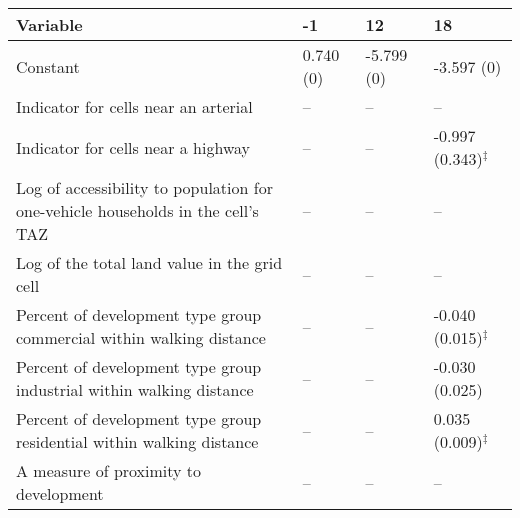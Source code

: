 
\begin{tabular}{p{3in}p{0.5in}p{0.5in}p{0.5in}}
\hline\hline
Variable & -1 & 12 & 18 \\\hline
Constant & 0.740 (0) & -5.799 (0) & -3.597 (0) \\
Indicator for cells near an arterial & -- & -- & -- \\
Indicator for cells near a highway & -- & -- & -0.997 (0.343)$^{\ddagger}$ \\
Log of accessibility to population for one-vehicle households in the cell's TAZ & -- & -- & -- \\
Log of the total land value in the grid cell & -- & -- & -- \\
Percent of development type group commercial within walking distance & -- & -- & -0.040 (0.015)$^{\ddagger}$ \\
Percent of development type group industrial within walking distance & -- & -- & -0.030 (0.025) \\
Percent of development type group residential within walking distance & -- & -- & 0.035 (0.009)$^{\ddagger}$ \\
A measure of proximity to development & -- & -- & -- \\
\hline\hline
\end{tabular}
